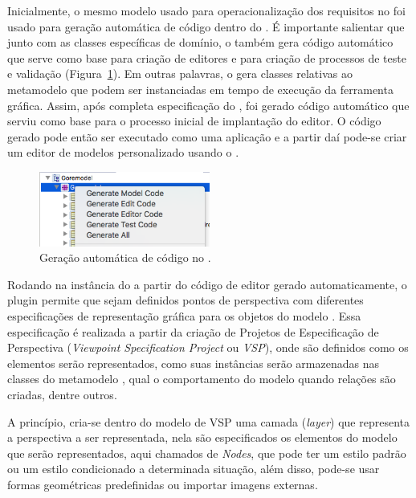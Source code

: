 Inicialmente, o mesmo modelo \ecore usado para operacionalização dos requisitos no \zanshin foi usado para geração automática de código dentro do \eclipse \emf. É importante salientar que junto com as classes específicas de domínio, o \emf também gera código automático que serve como base para criação de editores e para criação de processos de teste e validação (Figura~\ref{figura-gera-codigo}). Em outras palavras, o \emf gera classes relativas ao metamodelo que podem ser instanciadas em tempo de execução da ferramenta gráfica.  Assim, após completa especificação do \ecore, foi gerado código automático que serviu como base para o processo inicial de implantação do editor. O código gerado pode então ser executado como uma aplicação \eclipse e a partir daí pode-se criar um editor de modelos personalizado usando o \sirius.


\begin{figure}
	\centering
	\includegraphics[width=0.5\textwidth]{figuras/unagi/exemplo-gera-codigo.png}
	\caption{Geração automática de código no \eclipse.}
	\label{figura-gera-codigo}
\end{figure}

Rodando na instância do \eclipse a partir do código de editor gerado automaticamente, o plugin \sirius permite que sejam definidos pontos de perspectiva com diferentes especificações de representação gráfica para os objetos do modelo \ecore. Essa especificação é realizada a partir da criação de Projetos de Especificação de Perspectiva (\textit{Viewpoint Specification Project} ou \textit{VSP}), onde são definidos como os elementos serão representados, como suas instâncias serão armazenadas nas classes do metamodelo \ecore, qual o comportamento do modelo quando relações são criadas, dentre outros.

A princípio, cria-se dentro do modelo de VSP uma camada (\textit{layer}) que representa a perspectiva a ser representada, nela são especificados os elementos do modelo \ecore que serão representados, aqui chamados de \textit{Nodes}, que pode ter um estilo padrão ou um estilo condicionado a determinada situação, além disso, pode-se usar formas geométricas predefinidas ou importar imagens externas. 

